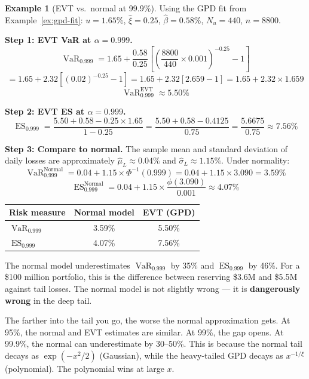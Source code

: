 \documentclass[11pt, a4paper]{article}
\theoremstyle{definition}
\newtheorem{example}{Example}[section]
\theoremstyle{plain}
\theoremstyle{remark}
\newcommand{\VaR}{\operatorname{VaR}}
\newcommand{\ES}{\operatorname{ES}}
\begin{document}
\begin{example}[EVT vs.\ normal at 99.9\%]\label{ex:evt-risk}
Using the GPD fit from Example~\ref{ex:gpd-fit}:
$u = 1.65\%$, $\hat\xi = 0.25$, $\hat\beta = 0.58\%$, $N_u = 440$, $n = 8800$.

\medskip
\textbf{Step 1: EVT VaR at $\alpha = 0.999$.}
\[
    \VaR_{0.999} = 1.65 + \frac{0.58}{0.25}
    \left[\left(\frac{8800}{440} \times 0.001\right)^{-0.25} - 1\right]
\]
\[
    = 1.65 + 2.32 \left[(0.02)^{-0.25} - 1\right]
    = 1.65 + 2.32 \left[2.659 - 1\right]
    = 1.65 + 2.32 \times 1.659
\]
\[
    \VaR_{0.999}^{\text{EVT}} \approx 5.50\%
\]

\textbf{Step 2: EVT ES at $\alpha = 0.999$.}
\[
    \ES_{0.999} = \frac{5.50 + 0.58 - 0.25 \times 1.65}{1 - 0.25}
    = \frac{5.50 + 0.58 - 0.4125}{0.75}
    = \frac{5.6675}{0.75} \approx 7.56\%
\]

\textbf{Step 3: Compare to normal.}
The sample mean and standard deviation of daily losses are approximately
$\hat\mu_L \approx 0.04\%$ and $\hat\sigma_L \approx 1.15\%$.
Under normality:
\[
    \VaR_{0.999}^{\text{Normal}} = 0.04 + 1.15 \times \Phi^{-1}(0.999)
    = 0.04 + 1.15 \times 3.090 = 3.59\%
\]
\[
    \ES_{0.999}^{\text{Normal}} = 0.04 + 1.15 \times \frac{\phi(3.090)}{0.001} \approx 4.07\%
\]

\medskip

\begin{center}
\begin{tabular}{@{}lcc@{}}
\toprule
\textbf{Risk measure} & \textbf{Normal model} & \textbf{EVT (GPD)} \\
\midrule
$\VaR_{0.999}$ & 3.59\% & 5.50\% \\
$\ES_{0.999}$  & 4.07\% & 7.56\% \\
\bottomrule
\end{tabular}
\end{center}

\medskip

The normal model underestimates $\VaR_{0.999}$ by 35\% and $\ES_{0.999}$ by 46\%.
For a \$100 million portfolio, this is the difference between reserving \$3.6M and \$5.5M against tail losses.
The normal model is not slightly wrong --- it is \textbf{dangerously wrong} in the deep tail.
\end{example}

\begin{keyresult}
The farther into the tail you go, the worse the normal approximation gets.
At 95\%, the normal and EVT estimates are similar.
At 99\%, the gap opens.
At 99.9\%, the normal can underestimate by 30--50\%.
This is because the normal tail decays as $\exp(-x^2/2)$ (Gaussian),
while the heavy-tailed GPD decays as $x^{-1/\xi}$ (polynomial).
The polynomial wins at large $x$.
\end{keyresult}
\end{document}
